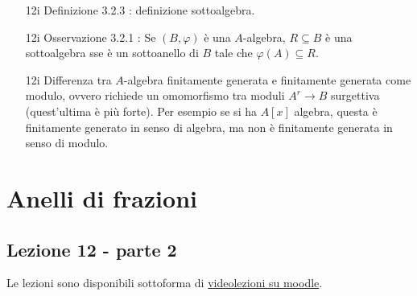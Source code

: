 \documentclass[italian]{article}
\begin{document}
\begin{enumerate}
      \item[12i] Definizione 3.2.3 \cite{vergura}: definizione sottoalgebra.
      \item[12i] Osservazione 3.2.1 \cite{vergura}: Se $(B, \varphi)$ è una
        $A$-algebra, $R \subseteq B$ è una sottoalgebra sse è un sottoanello di
        $B$ tale che $\varphi(A) \subseteq R$.
      \item[12i] Differenza tra $A$-algebra finitamente generata e finitamente
        generata come modulo, ovvero richiede un omomorfismo tra moduli $A^r \to B$
        surgettiva (quest'ultima è più forte). Per esempio se si ha $A\left[ x
        \right]$ algebra, questa è finitamente generato in senso di algebra, ma non
        è finitamente generata in senso di modulo. %
    \end{enumerate}  


    \section{Anelli di frazioni}
    
    \subsection{Lezione 12 - parte 2}
	
	Le lezioni sono disponibili sottoforma di 
	\href{https://didatticaonline.unitn.it/dol/course/view.php?id=23268}{videolezioni
		su moodle}.
	
\end{document}
